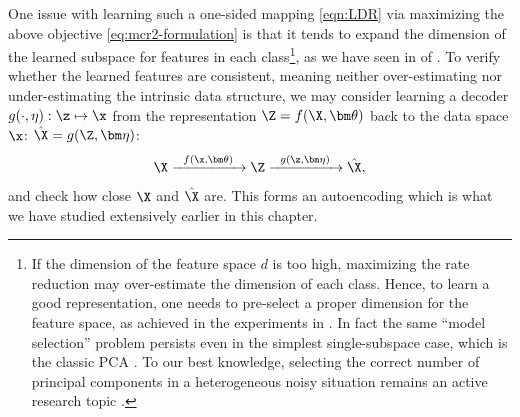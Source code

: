 \documentclass[../../book-main.tex]{subfiles}
\begin{document}
One issue with learning such a one-sided mapping \eqref{eqn:LDR} via
maximizing the above objective \eqref{eq:mcr2-formulation} is that it
tends to expand the dimension of the learned subspace for features in
each class\footnote{If the dimension of the feature space $d$ is too
    high, maximizing the rate reduction may over-estimate the dimension
    of each class. Hence, to learn a good representation, one needs to
    pre-select a proper dimension for the feature space, as achieved in
    the experiments in \cite{yu2020learning}. In fact the same ``model
    selection'' problem persists even in the simplest single-subspace
    case, which is the classic PCA \cite{Jolliffe1986}. To our best
    knowledge, selecting the correct number of principal components in a
    heterogeneous noisy situation remains an active research topic
\cite{hong2020selecting}.}, as we have seen in
 of
. To verify whether the learned features are
consistent, meaning neither over-estimating nor under-estimating the
intrinsic data structure, we may consider learning a decoder
$g(\cdot,\eta): \z \mapsto  \x$ from the representation $\Z =
f(\X,\bm\theta)$ back to the data space $\x$: $\hat \X = g(\Z, \bm\eta)$:
\begin{equation}
    \X \xrightarrow{\hspace{2mm} f(\x, \bm\theta)\hspace{2mm}} \Z
    \xrightarrow{\hspace{2mm} g(\z, \bm \eta) \hspace{2mm}} \hat \X,
    \label{eqn:autoencoding-ch6}
\end{equation}
and check how close $\X$ and $\hat \X$ are. This forms an
autoencoding which is what we have studied extensively earlier in this chapter.
\end{document}
